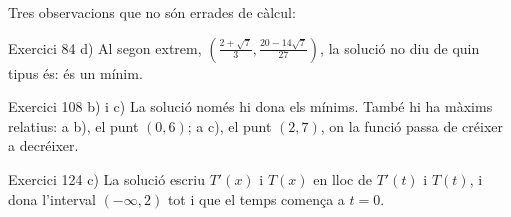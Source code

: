 
\ifobs
\bigskip
\noindent
Tres observacions que no són errades de càlcul:\par\nopagebreak

\begin{observacio}{Exercici 84 d)}
  Al segon extrem,
  $\left(\tfrac{2+\sqrt{7}}{3},\tfrac{20-14\sqrt{7}}{27}\right)$, la solució
  no diu de quin tipus és: és un mínim.
\end{observacio}

\begin{observacio}{Exercici 108 b) i c)}
  La solució només hi dona els mínims. També hi ha màxims relatius: a b), el
  punt $(0,6)$; a c), el punt $(2,7)$, on la funció passa de créixer a
  decréixer.
\end{observacio}

\begin{observacio}{Exercici 124 c)}
  La solució escriu $T'(x)$ i $T(x)$ en lloc de $T'(t)$ i $T(t)$, i dona
  l'interval $(-\infty,2)$ tot i que el temps comença a $t=0$.
\end{observacio}
\fi
